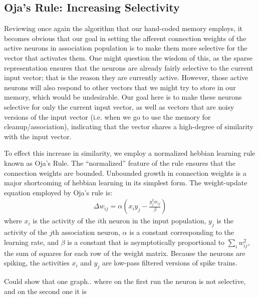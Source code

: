 \documentclass[10pt,letterpaper]{article}
\begin{document}
\subsection{Oja's Rule: Increasing Selectivity}
Reviewing once again the algorithm that our hand-coded memory employs, it becomes obvious that our goal in setting the afferent connection weights of the active neurons in association population is to make them more selective for the vector that activates them. One might question the wisdom of this, as the sparse representation ensures that the neurons are already fairly selective to the current input vector; that is the reason they are currently active. However, those active neurons will also respond to other vectors that we might try to store in our memory, which would be undesirable. Our goal here is to make these neurons selective for only the current input vector, as well as vectors that are noisy versions of the input vector (i.e. when we go to use the memory for cleanup/association), indicating that the vector shares a high-degree of similarity with the input vector.

To effect this increase in similarity, we employ a normalized hebbian learning rule known as Oja's Rule. The ``normalized'' feature of the rule ensures that the connection weights are bounded. Unbounded growth in connection weights is a major shortcoming of hebbian learning in its simplest form. The weight-update equation employed by Oja's rule is:
\begin{align}
  \Delta w_{ij} = \alpha (x_i y_j - \frac{y_j^2 w_{ij}}{\beta})
\end{align}
where $x_i$ is the activity of the $i$th neuron in the input population, $y_j$ is the activity of the $j$th association neuron, $\alpha$ is a constant corresponding to the learning rate, and $\beta$ is a constant that is asymptotically proportional to $\sum_i w_{ij}^2$, the sum of squares for each row of the weight matrix. Because the neurons are spiking, the activities $x_i$ and $y_j$ are low-pass filtered versions of spike trains.

Could show that one graph.. where on the first run the neuron is not selective, and on the second one it is
\end{document}
